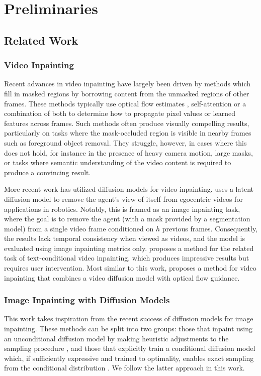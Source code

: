 \chapter{Preliminaries}
\section{Related Work}
\subsection{Video Inpainting} 
Recent advances in video inpainting have largely been driven by methods which fill in masked regions by borrowing content from the unmasked regions of other frames. These methods typically use optical flow estimates \citep{temporally, deepvideoinpainting, dfvi, flowedgeguided}, self-attention \citep{learningjoint, fuseformer, onionpeel, copypaste} or a combination of both \citep{propainter, fgt, endtoend} to determine how to propagate pixel values or learned features across frames. Such methods often produce visually compelling results, particularly on tasks where the mask-occluded region is visible in nearby frames such as foreground object removal. They struggle, however, in cases where this does not hold, for instance in the presence of heavy camera motion, large masks, or tasks where semantic understanding of the video content is required to produce a convincing result.

More recent work has utilized diffusion models for video inpainting. \citet{lookmanohands} uses a latent diffusion model \citep{stablediffusion, vahdat2021score} to remove the agent's view of itself from egocentric videos for applications in robotics. Notably, this is framed as an image inpainting task, where the goal is to remove the agent (with a mask provided by a segmentation model) from a single video frame conditioned on $h$ previous frames. Consequently, the results lack temporal consistency when viewed as videos, and the model is evaluated using image inpainting metrics only. \citet{avid} proposes a method for the related task of text-conditional video inpainting, which produces impressive results but requires user intervention. Most similar to this work, \citet{fgdvi} proposes a method for video inpainting that combines a video diffusion model with optical flow guidance. 


\subsection{Image Inpainting with Diffusion Models}
This work takes inspiration from the recent success of diffusion models for image inpainting. These methods can be split into two groups: those that inpaint using an unconditional diffusion model by making heuristic adjustments to the sampling procedure \citep{repaint, copaint}, and those that explicitly train a conditional diffusion model which, if sufficiently expressive and trained to optimality, enables exact sampling from the conditional distribution \citep{palette,zhang2023adding}. We follow the latter approach in this work.


